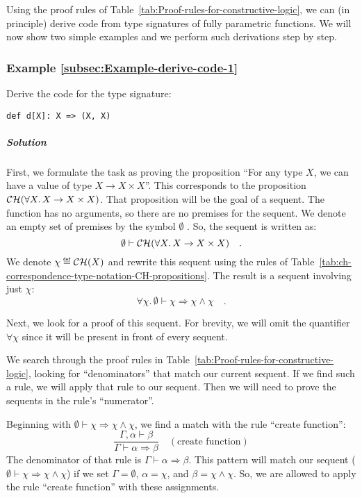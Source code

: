 Using the proof rules of Table~\ref{tab:Proof-rules-for-constructive-logic},
we can (in principle) derive code from type signatures of fully parametric
functions. We will now show two simple examples and we perform such
derivations step by step.

\subsubsection{Example \label{subsec:Example-derive-code-1}\ref{subsec:Example-derive-code-1}}

Derive the code for the type signature:
\begin{lstlisting}
def d[X]: X => (X, X)
\end{lstlisting}


\subparagraph{Solution}

First, we formulate the task as proving the proposition \textsf{``}For any
type $X$, we can have a value of type $X\rightarrow X\times X$\textsf{''}.
This corresponds to the proposition ${\cal CH}(\forall X.\,X\rightarrow X\times X)$.
That proposition will be the goal of a sequent. The function has no
arguments, so there are no premises for the sequent. We denote an
empty set of premises by the symbol $\emptyset$ .
So, the sequent is written as:
\[
\emptyset\vdash{\cal CH}(\forall X.\,X\rightarrow X\times X)\quad.
\]
We denote $\chi\triangleq{\cal CH}(X)$ and rewrite this sequent using
the rules of Table~\ref{tab:ch-correspondence-type-notation-CH-propositions}.
The result is a sequent involving just $\chi$:
\[
\forall\chi.\,\emptyset\vdash\chi\Rightarrow\chi\wedge\chi\quad.
\]

Next, we look for a proof of this sequent. For brevity, we will omit
the quantifier $\forall\chi$ since it will be present in front of
every sequent.

We search through the proof rules in Table~\ref{tab:Proof-rules-for-constructive-logic},
looking for \textsf{``}denominators\textsf{''} that match our current sequent. If
we find such a rule, we will apply that rule to our sequent. Then
we will need to prove the sequents in the rule\textsf{'}s \textsf{``}numerator\textsf{''}.

Beginning with $\emptyset\vdash\chi\Rightarrow\chi\wedge\chi$, we
find a match with the rule \textsf{``}create function\textsf{''}: 
\[
\frac{\Gamma,\alpha\vdash\beta}{\Gamma\vdash\alpha\Rightarrow\beta}\quad(\text{create function})
\]
The denominator of that rule is $\Gamma\vdash\alpha\Rightarrow\beta$.
This pattern will match our sequent ($\emptyset\vdash\chi\Rightarrow\chi\wedge\chi$)
if we set $\Gamma=\emptyset$, $\alpha=\chi$, and $\beta=\chi\wedge\chi$.
So, we are allowed to apply the rule \textsf{``}create function\textsf{''} with these
assignments.

